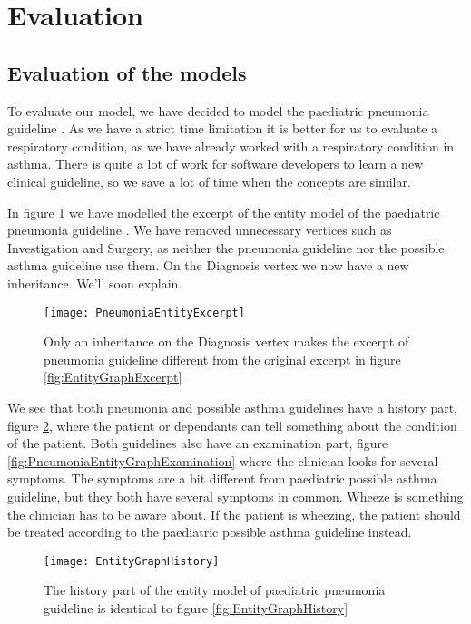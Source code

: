 \section{Evaluation}

\subsection{Evaluation of the models}
To evaluate our model, we have decided to model the paediatric pneumonia guideline \parencite{RepublicofKeny2016}. As we have a strict time limitation it is better for us to evaluate a respiratory condition, as we have already worked with a respiratory condition in asthma. There is quite a lot of work for software developers to learn a new clinical guideline, so we save a lot of time when the concepts are similar.

In figure \ref{fig:PneumoniaEntityGraphExcerpt} we have modelled the excerpt of the entity model of the paediatric pneumonia guideline \parencite{RepublicofKeny2016}. We have removed unnecessary vertices such as Investigation and Surgery, as neither the pneumonia guideline nor the possible asthma guideline use them. On the Diagnosis vertex we now have a new inheritance. We'll soon explain.

\begin{figure}[h!]
	\texttt{[image: PneumoniaEntityExcerpt]}
	\caption {Only an inheritance on the Diagnosis vertex makes the excerpt of pneumonia guideline \parencite{RepublicofKeny2016} different from the original excerpt in figure \ref{fig:EntityGraphExcerpt}}
	\label{fig:PneumoniaEntityGraphExcerpt}
\end{figure}

We see that both pneumonia and possible asthma guidelines have a history part, figure \ref{fig:PneumoniaEntityGraphHistory}, where the patient or dependants can tell something about the condition of the patient. Both guidelines also have an examination part, figure \ref{fig:PneumoniaEntityGraphExamination} where the clinician looks for several symptoms. The symptoms are a bit different from paediatric possible asthma guideline, but they both have several symptoms in common. Wheeze is something the clinician has to be aware about. If the patient is wheezing, the patient should be treated according to the paediatric possible asthma guideline instead.

\begin{figure}[h!]
	\texttt{[image: EntityGraphHistory]}
	\caption {The history part of the entity model of paediatric pneumonia guideline \parencite{RepublicofKeny2016} is identical to figure \ref{fig:EntityGraphHistory}}
	\label{fig:PneumoniaEntityGraphHistory}
\end{figure}

